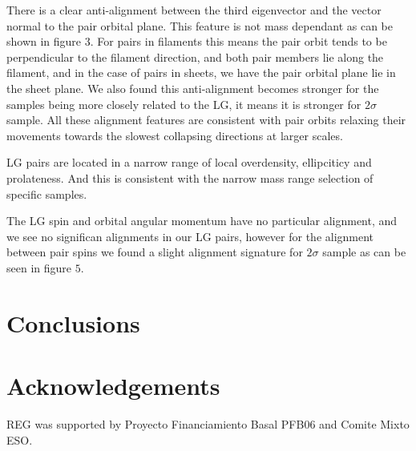 \documentclass{emulateapj}
\begin{document}
There is a clear anti-alignment between the third eigenvector and the vector normal 
to the pair orbital plane. This feature is not mass dependant as can be shown in
figure $3$.
For pairs in filaments this means the pair orbit tends to be perpendicular to the 
filament direction, and both pair members lie along the filament, and in the case 
of pairs in sheets, we have the pair orbital plane lie in the sheet plane.
We also found this anti-alignment becomes stronger for the samples being more 
closely related to the LG, it means it is stronger for $2\sigma$ sample.
All these alignment features are consistent with pair orbits relaxing their 
movements towards the slowest collapsing directions at larger scales.

LG pairs are located in a narrow range of local overdensity, ellipciticy and prolateness.
And this is consistent with the narrow mass range selection of specific samples.

The LG spin and orbital angular momentum have no particular alignment,
and we see no significan alignments in our LG pairs, however for the alignment
between pair spins we found a slight alignment signature for $2\sigma$ sample as
can be seen in figure $5$.

\section{Conclusions}
\label{sec:conclusions}


\section*{Acknowledgements}
REG was supported by Proyecto Financiamiento Basal PFB06 and Comite Mixto ESO.


 
\end{document}

